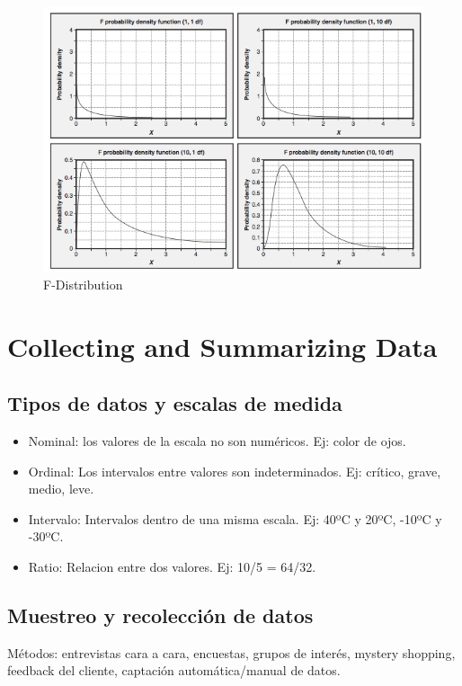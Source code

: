 \documentclass[]{article}
\begin{document}
\begin{figure}[ht!]
	\centering
	\includegraphics[width=120mm]{imagenes/F-Distribution.png}
	\caption{F-Distribution}
	\label{fig:F-Distribution}
\end{figure}

\section{Collecting and Summarizing Data}

\subsection{Tipos de datos y escalas de medida}

\begin{itemize}
	\item Nominal: los valores de la escala no son numéricos. Ej: color de ojos.
	\item Ordinal: Los intervalos entre valores son indeterminados. Ej: crítico, grave, medio, leve.
	\item Intervalo: Intervalos dentro de una misma escala. Ej: 40ºC y 20ºC, -10ºC y -30ºC.
	\item Ratio: Relacion entre dos valores. Ej: 10/5 = 64/32.
\end{itemize}

\subsection{Muestreo y recolección de datos}

Métodos: entrevistas cara a cara, encuestas, grupos de interés, mystery shopping, feedback del cliente, captación automática/manual de datos.
\end{document}
